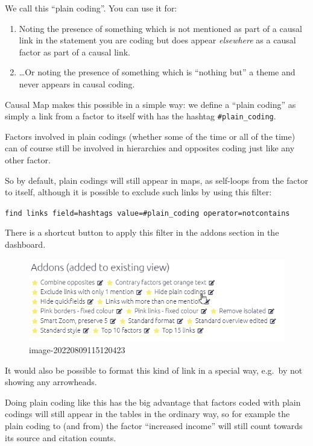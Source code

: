 \documentclass[
]{book}
\providecommand{\tightlist}{%
  \setlength{\itemsep}{0pt}\setlength{\parskip}{0pt}}
\begin{document}
We call this ``plain coding''. You can use it for:

\begin{enumerate}
\def\labelenumi{\arabic{enumi}.}
\tightlist
\item
  Noting the presence of something which is not mentioned as part of a causal link in the statement you are coding but does appear \emph{elsewhere} as a causal factor as part of a causal link.
\item
  \ldots Or noting the presence of something which is ``nothing but'' a theme and never appears in causal coding.
\end{enumerate}

Causal Map makes this possible in a simple way: we define a ``plain coding'' as simply a link from a factor to itself with has the hashtag \texttt{\#plain\_coding}.

Factors involved in plain codings (whether some of the time or all of the time) can of course still be involved in hierarchies and opposites coding just like any other factor.

So by default, plain codings will still appear in maps, as self-loops from the factor to itself, although it is possible to exclude such links by using this filter:

\texttt{find\ links\ field=hashtags\ value=\#plain\_coding\ operator=notcontains}

There is a shortcut button to apply this filter in the addons section in the dashboard.

\begin{figure}
\centering
\includegraphics[width=6.77083in,height=\textheight]{_assets/image-20220809115120423.png}
\caption{image-20220809115120423}
\end{figure}

It would also be possible to format this kind of link in a special way, e.g.~by not showing any arrowheads.

Doing plain coding like this has the big advantage that factors coded with plain codings will still appear in the tables in the ordinary way, so for example the plain coding to (and from) the factor ``increased income'' will still count towards its source and citation counts.
\end{document}
